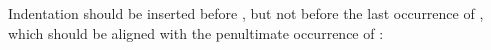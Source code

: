 \documentclass{article}
\begin{document}
\begin{AgdaAlign}
\begin{code}%
\>[0]\AgdaSpace{}%
\AgdaSpace{}%
\<%
\end{code}

Indentation should be inserted before , but not
before the last occurrence of , which should be
aligned with the penultimate occurrence of :
\begin{code}%
\>[0][@{}l@{\AgdaIndent{1}}]%
\>[2]\<%
\\
\>[2][@{}l@{\AgdaIndent{0}}]%
\>[4]%
\>[7]\AgdaSymbol{:}\AgdaSpace{}%
\<%
\\
%
\>[4]%
\>[7]\AgdaSymbol{:}%
\>[3I]\AgdaSpace{}%
\<%
\\
\>[.][@{}l@{}]\<[3I]%
\>[9]\<%
\end{code}
\end{AgdaAlign}
\end{document}
